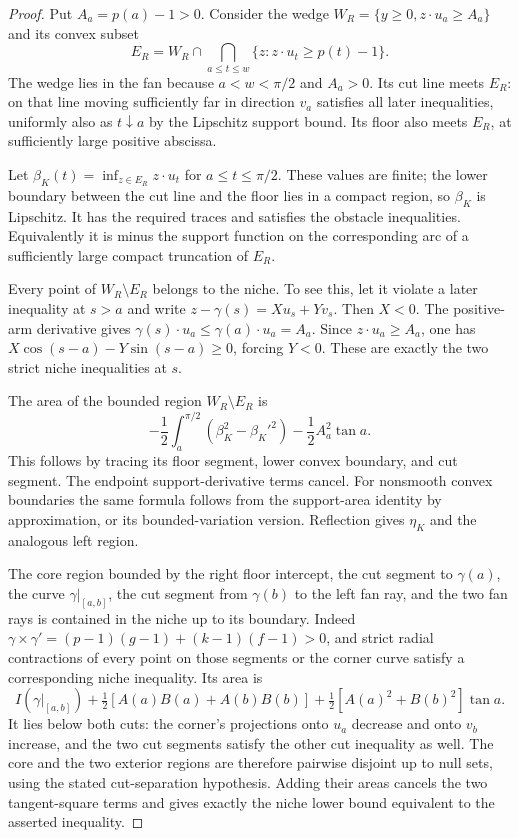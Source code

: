 \documentclass[11pt]{article}
\begin{document}
\begin{proof}
Put $A_a=p(a)-1>0$. Consider the wedge $W_R=\{y\ge0,z\cdot u_a\ge A_a\}$ and its convex subset
\[
 E_R=W_R\cap\bigcap_{a\le t\le w}\{z:z\cdot u_t\ge p(t)-1\}.
\]
The wedge lies in the fan because $a<w<\pi/2$ and $A_a>0$. Its cut line meets $E_R$: on that line moving sufficiently far in direction $v_a$ satisfies all later inequalities, uniformly also as $t\downarrow a$ by the Lipschitz support bound. Its floor also meets $E_R$, at sufficiently large positive abscissa.

Let $\beta_K(t)=\inf_{z\in E_R}z\cdot u_t$ for $a\le t\le\pi/2$. These values are finite; the lower boundary between the cut line and the floor lies in a compact region, so $\beta_K$ is Lipschitz. It has the required traces and satisfies the obstacle inequalities. Equivalently it is minus the support function on the corresponding arc of a sufficiently large compact truncation of $E_R$.

Every point of $W_R\setminus E_R$ belongs to the niche. To see this, let it violate a later inequality at $s>a$ and write $z-\gamma(s)=X u_s+Y v_s$. Then $X<0$. The positive-arm derivative gives $\gamma(s)\cdot u_a\le\gamma(a)\cdot u_a=A_a$. Since $z\cdot u_a\ge A_a$, one has $X\cos(s-a)-Y\sin(s-a)\ge0$, forcing $Y<0$. These are exactly the two strict niche inequalities at $s$.

The area of the bounded region $W_R\setminus E_R$ is
\[
 -\frac12\int_a^{\pi/2}(\beta_K^2-\beta_K'^2)-\frac12A_a^2\tan a.
\]
This follows by tracing its floor segment, lower convex boundary, and cut segment. The endpoint support-derivative terms cancel. For nonsmooth convex boundaries the same formula follows from the support-area identity by approximation, or its bounded-variation version. Reflection gives $\eta_K$ and the analogous left region.

The core region bounded by the right floor intercept, the cut segment to $\gamma(a)$, the curve $\gamma|_{[a,b]}$, the cut segment from $\gamma(b)$ to the left fan ray, and the two fan rays is contained in the niche up to its boundary. Indeed $\gamma\times\gamma'=(p-1)(g-1)+(k-1)(f-1)>0$, and strict radial contractions of every point on those segments or the corner curve satisfy a corresponding niche inequality. Its area is
\[
 I(\gamma|_{[a,b]})+\tfrac12[A(a)B(a)+A(b)B(b)]
 +\tfrac12[A(a)^2+B(b)^2]\tan a.
\]
It lies below both cuts: the corner's projections onto $u_a$ decrease and onto $v_b$ increase, and the two cut segments satisfy the other cut inequality as well. The core and the two exterior regions are therefore pairwise disjoint up to null sets, using the stated cut-separation hypothesis. Adding their areas cancels the two tangent-square terms and gives exactly the niche lower bound equivalent to the asserted inequality.
\end{proof}
\end{document}
